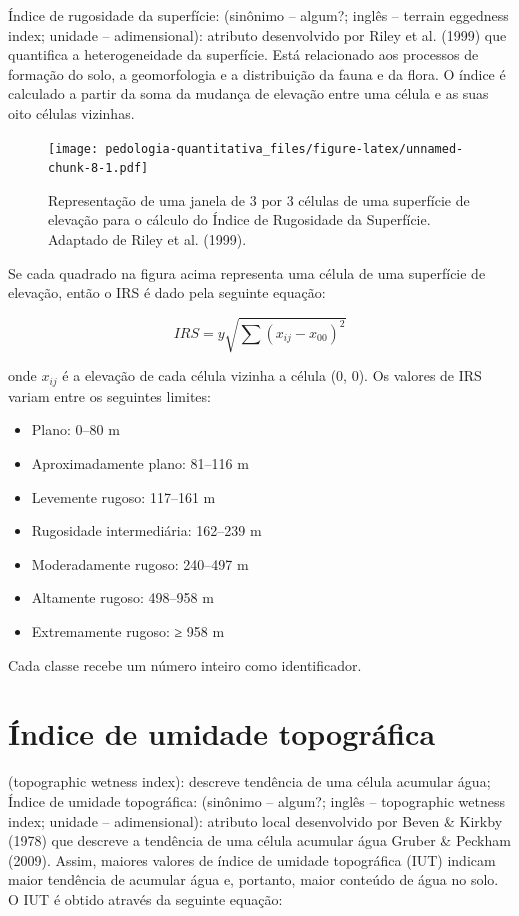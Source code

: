 \documentclass[]{book}
\providecommand{\tightlist}{%
  \setlength{\itemsep}{0pt}\setlength{\parskip}{0pt}}
\begin{document}
Índice de rugosidade da superfície: (sinônimo -- algum?; inglês --
terrain eggedness index; unidade -- adimensional): atributo desenvolvido
por Riley et al. (1999) que quantifica a heterogeneidade da superfície.
Está relacionado aos processos de formação do solo, a geomorfologia e a
distribuição da fauna e da flora. O índice é calculado a partir da soma
da mudança de elevação entre uma célula e as suas oito células vizinhas.

\begin{figure}[htbp]
\centering
\texttt{[image: pedologia-quantitativa\_files/figure-latex/unnamed-chunk-8-1.pdf]}
\caption{\label{fig:unnamed-chunk-8}Representação de uma janela de 3 por 3
células de uma superfície de elevação para o cálculo do Índice de
Rugosidade da Superfície. Adaptado de Riley et al. (1999).}
\end{figure}

Se cada quadrado na figura acima representa uma célula de uma superfície
de elevação, então o IRS é dado pela seguinte equação:

\[IRS = y \sqrt{\sum (x_{ij} - x_{00})^2}\]

onde \(x_{ij}\) é a elevação de cada célula vizinha a célula (0, 0). Os
valores de IRS variam entre os seguintes limites:

\begin{itemize}
\tightlist
\item
  Plano: 0--80 m
\item
  Aproximadamente plano: 81--116 m
\item
  Levemente rugoso: 117--161 m
\item
  Rugosidade intermediária: 162--239 m
\item
  Moderadamente rugoso: 240--497 m
\item
  Altamente rugoso: 498--958 m
\item
  Extremamente rugoso: ≥ 958 m
\end{itemize}

Cada classe recebe um número inteiro como identificador.

\section{Índice de umidade
topográﬁca}\label{indice-de-umidade-topograca}

(topographic wetness index): descreve tendência de uma célula acumular
água; Índice de umidade topográfica: (sinônimo -- algum?; inglês --
topographic wetness index; unidade -- adimensional): atributo local
desenvolvido por Beven \& Kirkby (1978) que descreve a tendência de uma
célula acumular água Gruber \& Peckham (2009). Assim, maiores valores de
índice de umidade topográfica (IUT) indicam maior tendência de acumular
água e, portanto, maior conteúdo de água no solo. O IUT é obtido através
da seguinte equação:
\end{document}
